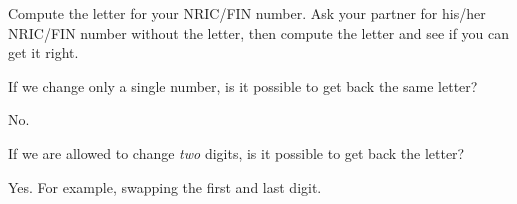 \documentclass[a4paper,12pt]{article}
\begin{document}
\begin{question}[skip-below=3\baselineskip]
Compute the letter for your NRIC/FIN number. Ask your partner for
his/her NRIC/FIN number without the letter, then compute
the letter and see if you can get it right.
\end{question}

\begin{question}[skip-below=3\baselineskip]
If we change only a single number, is it possible to get back the same letter?
\end{question}

\begin{solution}
No.
\end{solution}

\begin{question}[skip-below=3\baselineskip]
If we are allowed to change \emph{two} digits, is it possible to get back the letter?
\end{question}

\begin{solution}
Yes. For example, swapping the first and last digit.
\end{solution}
\end{document}
